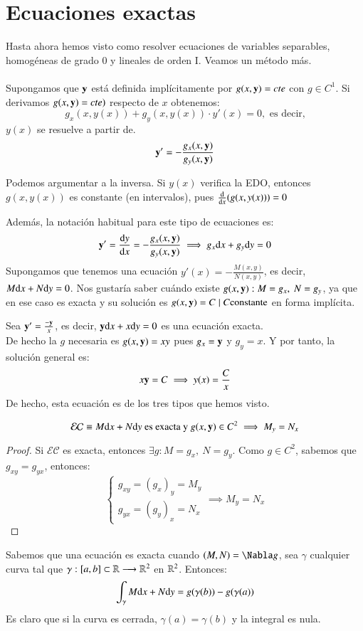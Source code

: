 \section{Ecuaciones exactas}
Hasta ahora hemos visto como resolver ecuaciones de variables separables, homogéneas de grado 0 y lineales de orden I. Veamos un método más.\\\\
Supongamos que $\mathbf{y}$ está definida implícitamente por $g(x, \mathbf{y}) = cte$ con $g \in C^1$. Si derivamos $g(x, \mathbf{y}) = cte)$ respecto de $x$ obtenemos:
$$
    g_x(x, y(x)) + g_y(x, y(x)) \cdot y'(x) = 0, \text{ es decir,}
$$
$y(x)$ se resuelve a partir de.
$$
    \mathbf{y'} = -\frac{g_x(x,\mathbf{y})}{g_y(x,\mathbf{y})}
$$
\begin{obs}
    Podemos argumentar a la inversa. Si $y(x)$ verifica la EDO, entonces $g(x, y(x))$ es constante (en intervalos), pues $\frac{\mathrm{d}}{\mathrm{d}x}(g(x, y(x))) = 0$
\end{obs}
Además, la notación habitual para este tipo de ecuaciones es:
$$
    \mathbf{y'} = \frac{\mathrm{d}y}{\mathrm{d}x} = -\frac{g_x(x,\mathbf{y})}{g_y(x,\mathbf{y})} \implies g_x\mathrm{d} x + g_y \mathrm{d} y = 0
$$
Supongamos que tenemos una ecuación $y'(x) = -\frac{M(x,y)}{N(x,y)}$, es decir, $M\mathrm{d} x + N \mathrm{d} y = 0$. Nos gustaría saber cuándo existe $g(x, \mathbf{y}) : M = g_x,\ N = g_y$, ya que en ese caso es exacta y su solución es $g(x, \mathbf{y}) = C \mid C \text{constante}$ en forma implícita.
\begin{eg}
    Sea $\mathbf{y'} = \frac{-\mathbf{y}}{x}$, es decir, $\mathbf{y}\mathrm{d} x + x \mathrm{d} y = 0$ es una ecuación exacta.\\
    De hecho la $g$ necesaria es $g(x,\mathbf{y}) = xy$ pues $g_x = \mathbf{y}$ y $g_y = x$. Y por tanto, la solución general es:
    $$
        x\mathbf{y} = C \implies y(x) = \frac{C}{x}
    $$
    De hecho, esta ecuación es de los tres tipos que hemos visto.
\end{eg}
\begin{pro}
    $$
        \mathcal{EC} \equiv M\mathrm{d} x + N\mathrm{d} y \text{ es exacta y }g(x, \mathbf{y}) \in C^2 \implies M_y = N_x
    $$
\end{pro}
\begin{proof}
    Si $\mathcal{EC}$ es exacta, entonces $\exists g : M = g_x,\ N = g_y$. Como $g \in C^2$, sabemos que $g_{xy} = g_{yx}$, entonces:
    $$
        \begin{cases}
            g_{xy} = (g_x)_y = M_y\\
            g_{yx} = (g_y)_x = N_x
        \end{cases} \implies M_y = N_x
    $$
\end{proof}
\begin{obs}
    Sabemos que una ecuación es exacta cuando $(M, N) = \Nabla g$, sea $\gamma$ cualquier curva tal que $\gamma : [a,b]\subset\mathbb{R} \longrightarrow \mathbb{R}^2$ en $\mathbb{R}^2$. Entonces:
    $$
        \int_\gamma M\mathrm{d} x + N\mathrm{d} y = g(\gamma(b)) - g(\gamma(a))
    $$
    Es claro que si la curva es cerrada, $\gamma(a)=\gamma(b)$ y la integral es nula.
\end{obs}

